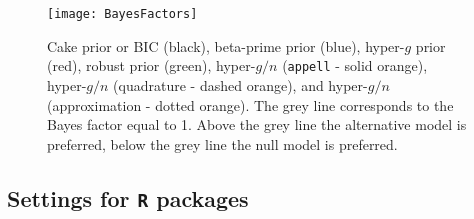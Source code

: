 \begin{figure}[h!]
	\centering
	\texttt{[image: BayesFactors]}
	\caption{Cake prior or BIC (black), 
		beta-prime prior (blue), 
		hyper-$g$ prior (red),
		robust prior (green),
		hyper-$g/n$ ({\tt appell} - solid orange),
		hyper-$g/n$ (quadrature - dashed orange), 
		and hyper-$g/n$ (approximation - dotted orange). The grey line corresponds to the Bayes factor equal to 1. Above the grey line the alternative model is preferred, below the grey line the null model is preferred.}
	\label{fig:bayesfactors}
\end{figure}

\subsection{Settings for {\tt R} packages} 

